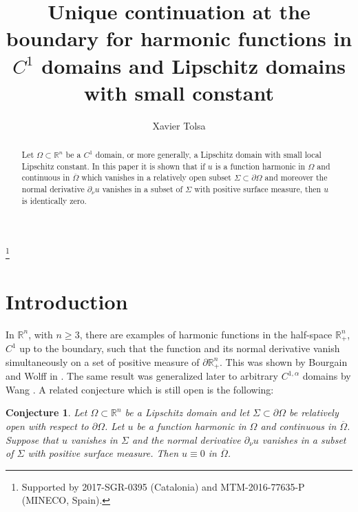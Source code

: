 \documentclass[11pt]{amsart}
\newcommand{\R}{{\mathbb R}}       %
\newtheorem*{conjecture}{Conjecture}
\theoremstyle{definition}
\theoremstyle{remark}
\numberwithin{equation}{section}
\begin{document}
\title[Unique continuation at the boundary]{Unique continuation at the boundary for harmonic functions in $C^1$ domains and Lipschitz domains with small constant}

\author{Xavier Tolsa}


\address{Xavier Tolsa \\
ICREA, Passeig Llu\'{\i}s Companys 23 08010 Barcelona, Catalonia;  Departament de Matem\`atiques, 
Universitat Aut\`onoma de Barcelona, 08193 Bellaterra, Catalonia; and Centre de Recerca Matem\`atica,
08193 Bellaterra, Catalonia.
}



\thanks{Supported by 2017-SGR-0395 (Catalonia) and MTM-2016-77635-P (MINECO, Spain).}


\begin{abstract}
Let $\Omega\subset\R^n$ be a $C^1$ domain, or more generally, a 
Lipschitz domain with small local Lipschitz constant. In this paper it is shown that if $u$ is a
function  harmonic in $\Omega$ and continuous in $\overline \Omega$ 
which vanishes in a relatively open subset $\Sigma\subset\partial\Omega$ and moreover
the normal derivative $\partial_\nu u$ vanishes in a subset of $\Sigma$ with positive surface
measure, then $u$ is identically zero.
\end{abstract}



\maketitle

\section{Introduction}

In $\R^n$, with $n\geq3$, there are examples of harmonic functions in the half-space $\R^{n}_+$, 
$C^1$ up to the boundary, such that the function and its normal derivative vanish simultaneously on a 
set of positive measure of $\partial \R^{n}_+$. This was shown by Bourgain and Wolff in \cite{BW}.
The same result was generalized later to arbitrary $C^{1,\alpha}$ domains by Wang \cite{Wang}.
A related conjecture which is still open is the following:

\begin{conjecture}
Let $\Omega\subset\R^n$ be a Lipschitz domain and let $\Sigma\subset \partial\Omega$ be relatively open with respect to $\partial\Omega$. Let $u$ be a function harmonic in $\Omega$ and continuous in $\overline\Omega$. Suppose that $u$  vanishes in $\Sigma$ and the normal derivative $\partial_\nu u$ vanishes
in a subset of $\Sigma$ with positive surface measure. Then $u\equiv0$ in $\overline\Omega$.
\end{conjecture}
\end{document}
